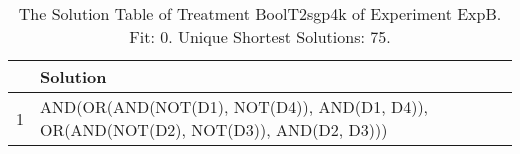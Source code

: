 \begin{table}[ht]
\centering
\begin{tabular}{rp{9cm}}
  \hline
 & Solution \\ 
  \hline
1 & AND(OR(AND(NOT(D1), NOT(D4)), AND(D1, D4)), OR(AND(NOT(D2), NOT(D3)), AND(D2, D3))) \\ 
   \hline
\end{tabular}
\caption{The Solution Table of Treatment BoolT2sgp4k of Experiment ExpB. Fit: 0. Unique Shortest Solutions: 75.} 
\end{table}
